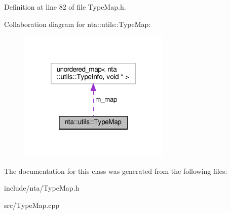 Definition at line 82 of file Type\+Map.\+h.



Collaboration diagram for nta\+:\+:utils\+:\+:Type\+Map\+:
\nopagebreak
\begin{figure}[H]
\begin{center}
\leavevmode
\includegraphics[width=205pt]{dd/d7a/classnta_1_1utils_1_1TypeMap__coll__graph}
\end{center}
\end{figure}


The documentation for this class was generated from the following files\+:\begin{DoxyCompactItemize}
\item 
include/nta/Type\+Map.\+h\item 
src/Type\+Map.\+cpp\end{DoxyCompactItemize}
